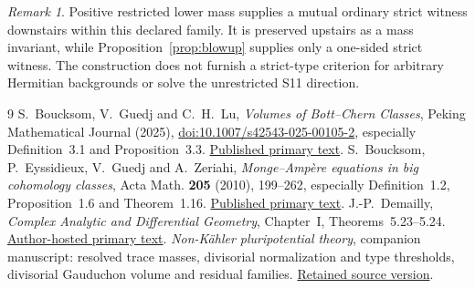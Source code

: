 \documentclass[11pt]{article}
\theoremstyle{remark}
\newtheorem{remark}[theorem]{Remark}
\begin{document}
\begin{remark}
Positive restricted lower mass supplies a mutual ordinary strict witness
downstairs within this declared family. It is preserved upstairs as a mass
invariant, while Proposition~\ref{prop:blowup} supplies only a one-sided
strict witness. The construction does not furnish a strict-type criterion
for arbitrary Hermitian backgrounds or solve the unrestricted S11 direction.
\end{remark}

\begin{thebibliography}{9}
 S.~Boucksom, V.~Guedj and C.~H.~Lu,
\emph{Volumes of Bott--Chern Classes}, Peking Mathematical Journal (2025),
\href{https://doi.org/10.1007/s42543-025-00105-2}{doi:10.1007/s42543-025-00105-2},
especially Definition~3.1 and Proposition~3.3.
\href{https://d-nb.info/1374372846/34}{Published primary text}.
 S.~Boucksom, P.~Eyssidieux, V.~Guedj and A.~Zeriahi,
\emph{Monge--Amp\`ere equations in big cohomology classes},
Acta Math. \textbf{205} (2010), 199--262, especially Definition~1.2,
Proposition~1.6 and Theorem~1.16.
\href{https://www.math.univ-toulouse.fr/~guedj/fichierspdf/BEGZ10.pdf}{Published primary text}.
 J.-P.~Demailly, \emph{Complex Analytic and Differential
Geometry}, Chapter~I, Theorems~5.23--5.24.
\href{https://www-fourier.univ-grenoble-alpes.fr/~demailly/manuscripts/agbook.pdf}{Author-hosted primary text}.
 \emph{Non-K\"ahler pluripotential theory}, companion
manuscript: resolved trace masses, divisorial normalization and type
thresholds, divisorial Gauduchon volume and residual families.
\href{https://github.com/MingchenXia/non-kahler-pluripotential-theory/tree/1ff73204b833e197437c62dbe172815cb417bf7b/book/author}{Retained source version}.
\end{thebibliography}
\end{document}
